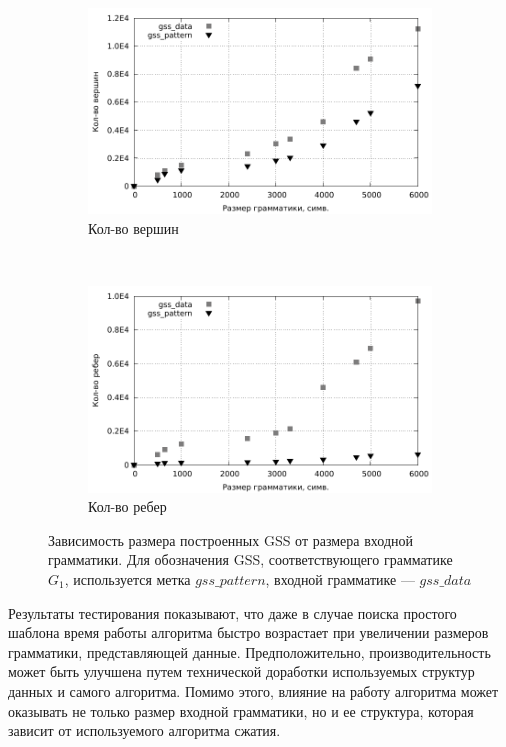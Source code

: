 \begin{figure}[h]
	\centering
	\begin{subfigure}[b]{0.45\textwidth}
		\centering
		\includegraphics[width=\textwidth]{pictures/gss.pdf}
		\caption{Кол-во вершин}
	\end{subfigure}
	~
	\begin{subfigure}[b]{0.45\textwidth}
		\centering
		\includegraphics[width=\textwidth]{pictures/gss_edge.pdf}
		\caption{Кол-во ребер}
	\end{subfigure}
	\caption{Зависимость размера построенных GSS от размера входной грамматики. Для обозначения GSS, соответствующего грамматике $G_1$, используется метка $gss\_pattern$, входной грамматике --- $gss\_data$}
	\label{gss}
\end{figure}

Результаты тестирования показывают, что даже в случае поиска простого шаблона время работы алгоритма быстро возрастает при увеличении размеров грамматики, представляющей данные. Предположительно, производительность может быть улучшена путем технической доработки используемых структур данных и самого алгоритма. Помимо этого, влияние на работу алгоритма может оказывать не только размер входной грамматики, но и ее структура, которая зависит от используемого алгоритма сжатия.
